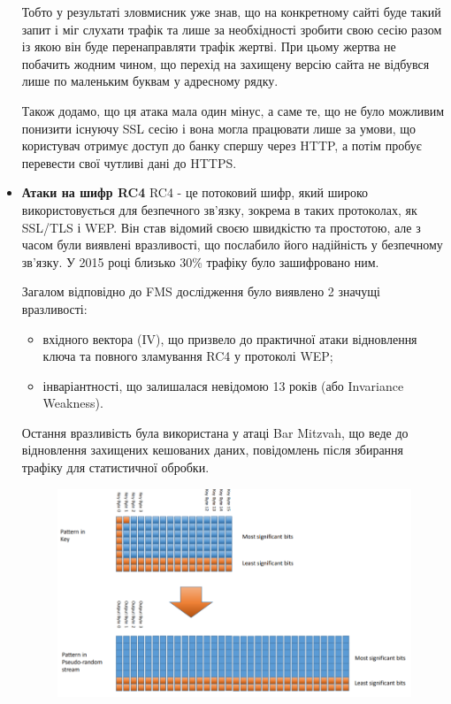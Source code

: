 \begin{itemize}
    Тобто у результаті зловмисник уже знав, що на конкретному сайті буде такий запит і міг слухати трафік та лише за необхідності зробити свою сесію разом із якою він буде перенаправляти трафік жертві. При цьому жертва не побачить жодним чином, що перехід на захищену версію сайта не відбувся лише по маленьким буквам у адресному рядку.


    Також додамо, що ця атака мала один мінус, а саме те, що не було можливим понизити існуючу SSL сесію і вона могла працювати лише за умови, що користувач отримує доступ до банку спершу через HTTP, а потім пробує перевести свої чутливі дані до HTTPS.


\item \textbf{Атаки на шифр RC4}
    RC4 - це потоковий шифр, який широко використовується для безпечного зв’язку, зокрема в таких протоколах, як SSL/TLS і WEP. Він став відомий своєю швидкістю та простотою, але з часом були виявлені вразливості, що послабило його надійність у безпечному зв’язку. У 2015 році близько 30\% трафіку було зашифровано ним.


    Загалом відповідно до FMS дослідження було виявлено 2 значущі вразливості:
    \begin{itemize}
        \item вхідного вектора (IV), що призвело до практичної атаки відновлення ключа та повного зламування RC4 у протоколі WEP;
        \item інваріантності, що залишалася невідомою 13 років (або Invariance Weakness).
    \end{itemize}

    
    Остання вразливість була використана у атаці Bar Mitzvah, що веде до відновлення захищених кешованих даних, повідомлень після збирання трафіку для статистичної обробки.

    \begin{figure}[!ht]
        \centering
        \includegraphics[scale=0.35]{../IMAGES/rc4_l_pattern.png}
        \label{weak_keys_rc4}
    \end{figure}


\end{itemize}
